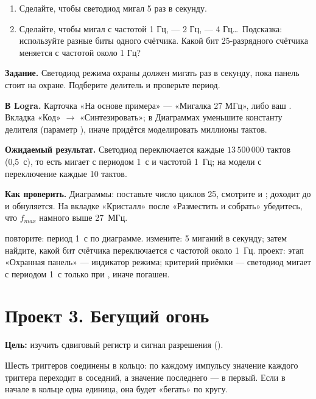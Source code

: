 \begin{taskbox}
\begin{enumerate}
  \item Сделайте, чтобы светодиод мигал 5 раз в секунду.
  \item Сделайте, чтобы  мигал с частотой 1 Гц,  --- 2 Гц,
         --- 4 Гц\ldots\ Подсказка: используйте разные биты одного
        счётчика. Какой бит 25-разрядного счётчика меняется с частотой около 1 Гц?
\end{enumerate}
\end{taskbox}

\begin{diybox}
\textbf{Задание.} Светодиод режима охраны должен мигать раз в секунду, пока панель стоит на охране. Подберите делитель и проверьте период.

\textbf{В Logra.} Карточка «На основе примера» --- «Мигалка 27 МГц», либо ваш . Вкладка «Код» $\to$ «Синтезировать»; в Диаграммах уменьшите константу делителя (параметр ), иначе придётся моделировать миллионы тактов.

\textbf{Ожидаемый результат.} Светодиод переключается каждые $13\,500\,000$ тактов (0,5~с), то есть мигает с периодом 1~с и частотой 1~Гц; на модели с  переключение каждые 10 тактов.

\textbf{Как проверить.} Диаграммы: поставьте число циклов 25, смотрите  и ;  доходит до  и обнуляется. На вкладке «Кристалл» после «Разместить и собрать» убедитесь, что $f_{max}$ намного выше 27~МГц.

 повторите: период 1~с по диаграмме.  измените: 5 миганий в секунду; затем найдите, какой бит счётчика переключается с частотой около 1~Гц.  проект: этап «Охранная панель» --- индикатор режима; критерий приёмки --- светодиод мигает с периодом 1~с только при , иначе погашен.
\end{diybox}

\section{Проект 3. Бегущий огонь}

\textbf{Цель:} изучить сдвиговый регистр и сигнал разрешения ().

Шесть триггеров соединены в кольцо: по каждому импульсу  значение
каждого триггера переходит в соседний, а значение последнего --- в первый.
Если в начале в кольце одна единица, она будет «бегать» по кругу.

